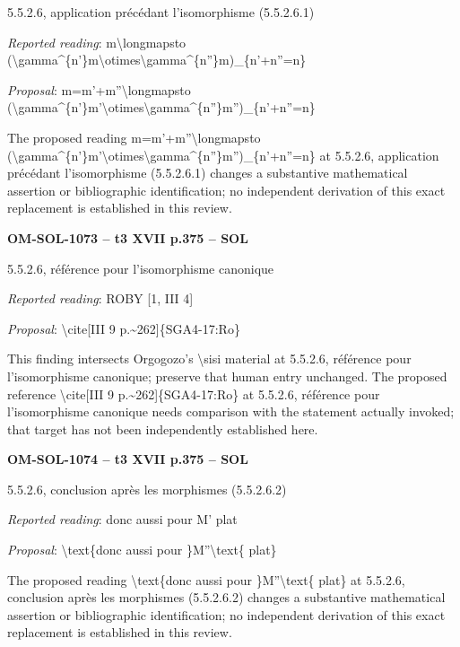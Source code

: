 5.5.2.6, application précédant l'isomorphisme (5.5.2.6.1)\par
\emph{Reported reading}: m\textbackslash{}longmapsto (\textbackslash{}gamma\textasciicircum{}\{n'\}m\textbackslash{}otimes\textbackslash{}gamma\textasciicircum{}\{n''\}m)\_\{n'+n''=\allowbreak n\}\par
\emph{Proposal}: m=\allowbreak m'+m''\textbackslash{}longmapsto (\textbackslash{}gamma\textasciicircum{}\{n'\}m'\textbackslash{}otimes\textbackslash{}gamma\textasciicircum{}\{n''\}m'')\_\{n'+n''=\allowbreak n\}\par
The proposed reading m=\allowbreak m'+m''\textbackslash{}longmapsto (\textbackslash{}gamma\textasciicircum{}\{n'\}m'\textbackslash{}otimes\textbackslash{}gamma\textasciicircum{}\{n''\}m'')\_\{n'+n''=\allowbreak n\} at 5.5.2.6, application précédant l'isomorphisme (5.5.2.6.1) changes a substantive mathematical assertion or bibliographic identification; no independent derivation of this exact replacement is established in this review.\par
\par\noindent\textbf{OM-SOL-1073 -- t3 XVII p.375 -- SOL}\par
5.5.2.6, référence pour l'isomorphisme canonique\par
\emph{Reported reading}: ROBY [1, III 4]\par
\emph{Proposal}: \textbackslash{}cite[III 9 p.\textasciitilde{}262]\{SGA4-17:Ro\}\par
This finding intersects Orgogozo's \textbackslash{}sisi material at 5.5.2.6, référence pour l'isomorphisme canonique; preserve that human entry unchanged. The proposed reference \textbackslash{}cite[III 9 p.\textasciitilde{}262]\{SGA4-17:Ro\} at 5.5.2.6, référence pour l'isomorphisme canonique needs comparison with the statement actually invoked; that target has not been independently established here.\par
\par\noindent\textbf{OM-SOL-1074 -- t3 XVII p.375 -- SOL}\par
5.5.2.6, conclusion après les morphismes (5.5.2.6.2)\par
\emph{Reported reading}: donc aussi pour M' plat\par
\emph{Proposal}: \textbackslash{}text\{donc aussi pour \}M''\textbackslash{}text\{ plat\}\par
The proposed reading \textbackslash{}text\{donc aussi pour \}M''\textbackslash{}text\{ plat\} at 5.5.2.6, conclusion après les morphismes (5.5.2.6.2) changes a substantive mathematical assertion or bibliographic identification; no independent derivation of this exact replacement is established in this review.\par
